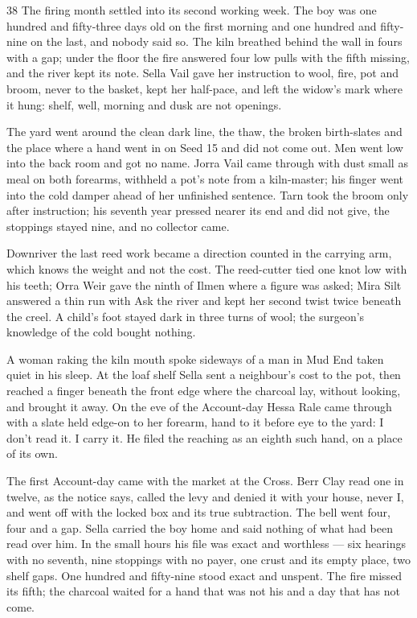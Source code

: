 \begin{CRchronicle}{38}
The firing month settled into its second working week. The boy was one hundred and fifty-three days old on the first morning and one hundred and fifty-nine on the last, and nobody said so. The kiln breathed behind the wall in fours with a gap; under the floor the fire answered four low pulls with the fifth missing, and the river kept its note. Sella Vail gave her instruction to wool, fire, pot and broom, never to the basket, kept her half-pace, and left the widow’s mark where it hung: shelf, well, morning and dusk are not openings.

The yard went around the clean dark line, the thaw, the broken birth-slates and the place where a hand went in on Seed 15 and did not come out. Men went low into the back room and got no name. Jorra Vail came through with dust small as meal on both forearms, withheld a pot’s note from a kiln-master; his finger went into the cold damper ahead of her unfinished sentence. Tarn took the broom only after instruction; his seventh year pressed nearer its end and did not give, the stoppings stayed nine, and no collector came.

Downriver the last reed work became a direction counted in the carrying arm, which knows the weight and not the cost. The reed-cutter tied one knot low with his teeth; Orra Weir gave the ninth of Ilmen where a figure was asked; Mira Silt answered a thin run with Ask the river and kept her second twist twice beneath the creel. A child’s foot stayed dark in three turns of wool; the surgeon’s knowledge of the cold bought nothing.

A woman raking the kiln mouth spoke sideways of a man in Mud End taken quiet in his sleep. At the loaf shelf Sella sent a neighbour’s cost to the pot, then reached a finger beneath the front edge where the charcoal lay, without looking, and brought it away. On the eve of the Account-day Hessa Rale came through with a slate held edge-on to her forearm, hand to it before eye to the yard: I don’t read it. I carry it. He filed the reaching as an eighth such hand, on a place of its own.

The first Account-day came with the market at the Cross. Berr Clay read one in twelve, as the notice says, called the levy and denied it with your house, never I, and went off with the locked box and its true subtraction. The bell went four, four and a gap. Sella carried the boy home and said nothing of what had been read over him. In the small hours his file was exact and worthless --- six hearings with no seventh, nine stoppings with no payer, one crust and its empty place, two shelf gaps. One hundred and fifty-nine stood exact and unspent. The fire missed its fifth; the charcoal waited for a hand that was not his and a day that has not come.
\end{CRchronicle}
